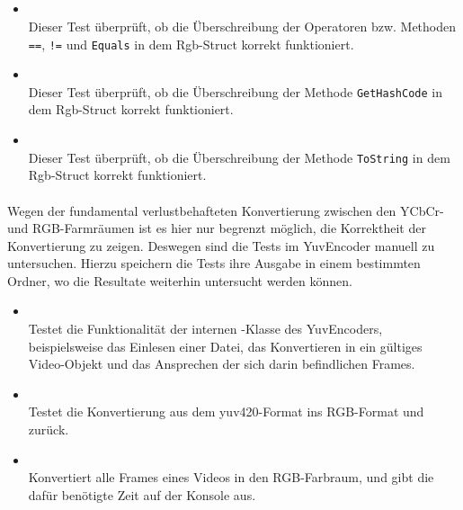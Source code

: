 \subsection{}

\paragraph{}

\begin{itemize}

\item{}~\\
Dieser Test überprüft, ob die Überschreibung der Operatoren bzw. Methoden \verb#==#, \verb#!=# und \verb#Equals# in dem Rgb-Struct korrekt funktioniert.

\item{}~\\
Dieser Test überprüft, ob die Überschreibung der Methode \verb#GetHashCode# in dem Rgb-Struct korrekt funktioniert.

\item{}~\\
Dieser Test überprüft, ob die Überschreibung der Methode \verb#ToString# in dem Rgb-Struct korrekt funktioniert.
\end{itemize}

\paragraph{}
Wegen der fundamental verlustbehafteten Konvertierung zwischen den YCbCr- und RGB-Farmräumen ist es hier nur begrenzt möglich, die Korrektheit der Konvertierung zu zeigen. Deswegen sind die Tests im YuvEncoder manuell zu untersuchen. Hierzu speichern die Tests ihre Ausgabe in einem bestimmten Ordner, wo die Resultate weiterhin untersucht werden können.
\begin{itemize}
	\item {}~\\
	Testet die Funktionalität der internen -Klasse des YuvEncoders, beispielsweise das Einlesen einer Datei, das Konvertieren in ein gültiges Video-Objekt und das Ansprechen der sich darin befindlichen Frames.
	\item {}~\\
	Testet die Konvertierung aus dem yuv420-Format ins RGB-Format und zurück.
	\item {}~\\
	Konvertiert alle Frames eines Videos in den RGB-Farbraum, und gibt die dafür benötigte Zeit auf der Konsole aus.
\end{itemize}

